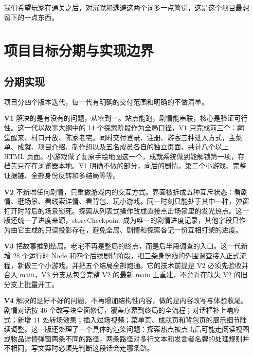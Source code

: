 我们希望玩家在通关之后，对沉默和逃避这两个词多一点警觉，这是这个项目最想留下的一点东西。

\section{项目目标分期与实现边界}

\subsection{分期实现}

项目分四个版本迭代，每一代有明确的交付范围和明确的不做清单。

\textbf{V1} 解决的是有没有的问题，从零到一。站点能跑，剧情能串联，核心是验证可行性。这一代以故事大纲中的 14 个探索阶段作为全局口径，V1 只完成前三个：祠堂醒来、村口开放、陈家老宅。同时交付登录、注册、游客三种进入方式，主菜单、成就、项目介绍、制作组以及五名成员各自的独立页面，共计八个以上 HTML 页面。小游戏做了复原手绘地图这一个，成就系统做到能解锁第一项，存档先只存在浏览器本地。V1 明确不做的部分，向后的剧情，第二个小游戏、完整证据链、全部身份反转和多结局等等。

\textbf{V2} 不新增任何剧情，只重做游戏内的交互方式。界面被拆成五种互斥状态：看剧情、逛场景、看线索详情、看背包、玩小游戏。同一时刻只能处于其中一种，弹窗打开时背后的场景锁死。探索从列表式操作改成直接点击场景里的发光热点。这一版还统一了进度来源，storyCheckpoint 成为唯一的剧情进度记录，其他字段只作为由它生成的只读投影存在，避免全局、剧情和探索各记一份互相打架的进度。

\textbf{V3} 把故事推到结局。老宅不再是整局的终点，而是后半段调查的入口。这一代新增 28 个运行时 Node 和四个后续剧情阶段，把三条身份线的外围调查接入正式流程，新做三个小游戏，并把五个结局全部跑通。它的技术前提是 V2 必须先验收并合入 main，V3 分支从包含完整 V2 的最新 main 上重建，不允许在缺失 V2 的旧分支上批量开工。

\textbf{V4} 解决的是好不好的问题，不再增加结构性内容，做的是内容改写与体验收尾。剧情对话按 46 个改写块全面修订，覆盖序幕到终局的全流程；对话框补上响应式；新增 11 处转场效果；插入过场视频；菜单页、成就页和背包页的展示细节陆续调整。这一版还处理了一个具体的渲染问题：探索热点被点击后可能走阅读视图或物品详情弹窗两条不同的路径，两条路径对多行文本和发言者名牌的处理规则并不相同，写文案时必须先判断这段话会走哪条路。


